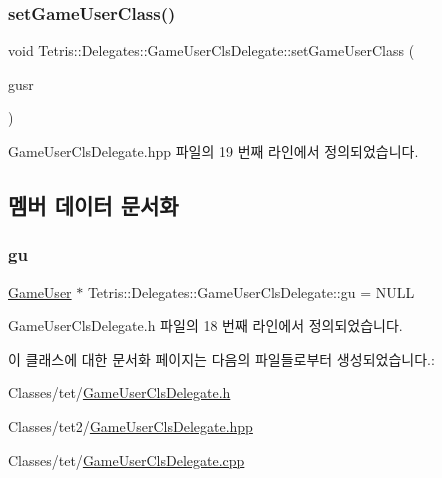 \subsubsection{\texorpdfstring{set\+Game\+User\+Class()}{setGameUserClass()}\hspace{0.1cm}{\footnotesize\ttfamily [2/2]}}
{\footnotesize\ttfamily void Tetris\+::\+Delegates\+::\+Game\+User\+Cls\+Delegate\+::set\+Game\+User\+Class (\begin{DoxyParamCaption}\item[{\hyperlink{class_tetris_1_1_users_1_1_game_user}{Game\+User} $\ast$}]{gusr }\end{DoxyParamCaption})\hspace{0.3cm}{\ttfamily [inline]}}



Game\+User\+Cls\+Delegate.\+hpp 파일의 19 번째 라인에서 정의되었습니다.



\subsection{멤버 데이터 문서화}
\mbox{\label{class_tetris_1_1_delegates_1_1_game_user_cls_delegate_affeaedfa26fa58ee383fff43692f6709}} 
\subsubsection{\texorpdfstring{gu}{gu}}
{\footnotesize\ttfamily \hyperlink{class_tetris_1_1_users_1_1_game_user}{Game\+User} $\ast$ Tetris\+::\+Delegates\+::\+Game\+User\+Cls\+Delegate\+::gu = N\+U\+LL\hspace{0.3cm}{\ttfamily [protected]}}



Game\+User\+Cls\+Delegate.\+h 파일의 18 번째 라인에서 정의되었습니다.



이 클래스에 대한 문서화 페이지는 다음의 파일들로부터 생성되었습니다.\+:\begin{DoxyCompactItemize}
\item 
Classes/tet/\hyperlink{_game_user_cls_delegate_8h}{Game\+User\+Cls\+Delegate.\+h}\item 
Classes/tet2/\hyperlink{_game_user_cls_delegate_8hpp}{Game\+User\+Cls\+Delegate.\+hpp}\item 
Classes/tet/\hyperlink{_game_user_cls_delegate_8cpp}{Game\+User\+Cls\+Delegate.\+cpp}\end{DoxyCompactItemize}
